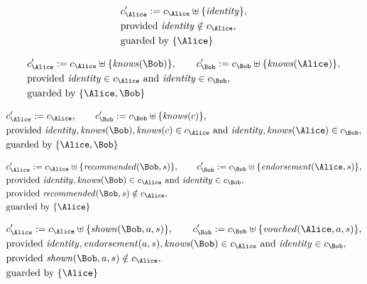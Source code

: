 \begin{align*}
&
c'_
{
\Alice
}
 := 
c_
{
\Alice
}
 \uplus 
\{
\mathit{
identity
}
\}
,\\
&
\text{provided } 
\mathit{
identity
}
 \notin c_
{
\Alice
}
,\\
&
\text{guarded by } \{
\Alice
\}
\end{align*}

\begin{align*}
&
c'_
{
\Alice
}
 := 
c_
{
\Alice
}
 \uplus 
\{
\mathit{
knows
}
(
\Bob
)
\}
, \qquad 
c'_
{
\Bob
}
 := 
c_
{
\Bob
}
 \uplus 
\{
\mathit{
knows
}
(
\Alice
)
\}
,\\
&
\text{provided } 
\mathit{
identity
}
 \in c_
{
\Alice
}
 \text{ and } 
\mathit{
identity
}
 \in c_
{
\Bob
}
,\\
&
\text{guarded by } \{
\Alice
,
\Bob
\}
\end{align*}

\begin{align*}
&
c'_
{
\Alice
}
 := 
c_
{
\Alice
}
, \qquad 
c'_
{
\Bob
}
 := 
c_
{
\Bob
}
 \uplus 
\{
\mathit{
knows
}
(
c
)
\}
,\\
&
\text{provided } 
\mathit{
identity
}
,
\mathit{
knows
}
(
\Bob
)
,
\mathit{
knows
}
(
c
)
 \in c_
{
\Alice
}
 \text{ and } 
\mathit{
identity
}
,
\mathit{
knows
}
(
\Alice
)
 \in c_
{
\Bob
}
,\\
&
\text{guarded by } \{
\Alice
,
\Bob
\}
\end{align*}

\begin{align*}
&
c'_
{
\Alice
}
 := 
c_
{
\Alice
}
 \uplus 
\{
\mathit{
recommended
}
(
\Bob
,
s
)
\}
, \qquad 
c'_
{
\Bob
}
 := 
c_
{
\Bob
}
 \uplus 
\{
\mathit{
endorsement
}
(
\Alice
,
s
)
\}
,\\
&
\text{provided } 
\mathit{
identity
}
,
\mathit{
knows
}
(
\Bob
)
 \in c_
{
\Alice
}
 \text{ and } 
\mathit{
identity
}
 \in c_
{
\Bob
}
,\\
&
\text{provided } 
\mathit{
recommended
}
(
\Bob
,
s
)
 \notin c_
{
\Alice
}
,\\
&
\text{guarded by } \{
\Alice
\}
\end{align*}

\begin{align*}
&
c'_
{
\Alice
}
 := 
c_
{
\Alice
}
 \uplus 
\{
\mathit{
shown
}
(
\Bob
,
a
,
s
)
\}
, \qquad 
c'_
{
\Bob
}
 := 
c_
{
\Bob
}
 \uplus 
\{
\mathit{
vouched
}
(
\Alice
,
a
,
s
)
\}
,\\
&
\text{provided } 
\mathit{
identity
}
,
\mathit{
endorsement
}
(
a
,
s
)
,
\mathit{
knows
}
(
\Bob
)
 \in c_
{
\Alice
}
 \text{ and } 
\mathit{
identity
}
 \in c_
{
\Bob
}
,\\
&
\text{provided } 
\mathit{
shown
}
(
\Bob
,
a
,
s
)
 \notin c_
{
\Alice
}
,\\
&
\text{guarded by } \{
\Alice
\}
\end{align*}
